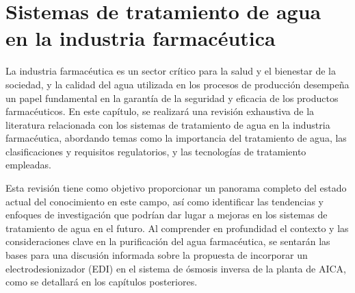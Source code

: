 \section{Sistemas de tratamiento de agua en la industria farmacéutica}

La industria farmacéutica es un sector crítico para la salud y el bienestar de la sociedad, y la calidad del agua utilizada
en los procesos de producción desempeña un papel fundamental en la garantía de la seguridad y eficacia de los productos farmacéuticos. En este capítulo,
se realizará una revisión exhaustiva de la literatura relacionada con los sistemas de tratamiento de agua en la industria farmacéutica, abordando temas
como la importancia del tratamiento de agua, las clasificaciones y requisitos regulatorios, y las tecnologías de tratamiento empleadas.

Esta revisión tiene como objetivo proporcionar un panorama completo del estado actual del conocimiento en este campo, así como identificar las tendencias y enfoques de investigación que podrían dar lugar a mejoras en los sistemas de tratamiento de agua en el futuro. Al comprender en profundidad el contexto y las consideraciones clave en la purificación del agua farmacéutica, se sentarán las bases para una discusión informada sobre la propuesta de incorporar un electrodesionizador (EDI) en el sistema de ósmosis inversa de la planta de AICA, como se detallará en los capítulos posteriores.








